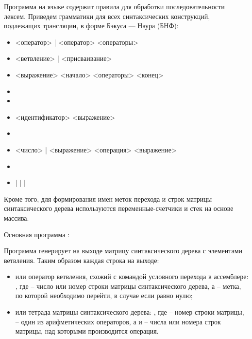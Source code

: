 Программа на языке  содержит правила для обработки последовательности лексем. Приведем грамматики для всех синтаксических конструкций, подлежащих трансляции, в форме Бэкуса --- Наура (БНФ):

\begin{itemize}[leftmargin=0.9em]
	\item {} <оператор> | <оператор> <операторы>
	\item {} <ветвление> | <присваивание>
	\item {}  \code{(} <выражение> \code{)} <начало> <операторы> <конец>
	\item {} \code{\{}
	\item {} \code{\}}
	\item {} <идентификатор> \code{=} <выражение> \code{;}
	\item {} \code{[A-Za-z\_][A-Za-z0-9\_]+}
	\item {} <число> | <выражение> <операция> <выражение>
	\item {} \code{[0-9]+}
	\item {} \code{+} | \code{-} | \code{*} | \code{/}
\end{itemize}

Кроме того, для формирования имен меток перехода и строк матрицы синтаксического дерева используются переменные-счетчики и стек на основе массива.


Основная программа :


Программа генерирует на выходе матрицу синтаксического дерева с элементами ветвления. Таким образом каждая строка на выходе:

\begin{itemize}
	\item или оператор ветвления, схожий с командой условного перехода в ассемблере: , где  -- число или номер строки матрицы синтаксического дерева, а  -- метка, по которой необходимо перейти, в случае если  равно нулю;
	\item или тетрада матрицы синтаксического дерева: , где  -- номер строки матрицы,  -- один из арифметических операторов, а  и  -- числа или номера строк матрицы, над которыми производится операция. 
\end{itemize}

